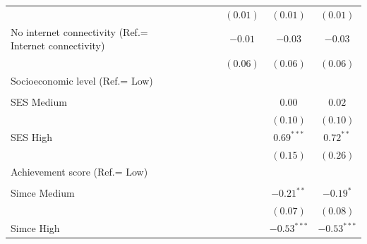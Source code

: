 \documentclass[
  12pt,
  letterpaper,
]{article}
\begin{document}
\begin{table}
{\begin{center}
{\begin{threeparttable}
\begin{tabular}{l c c c c c c}
                                                       &               &               &               & $(0.01)$      & $(0.01)$      & $(0.01)$      \\
No internet connectivity (Ref.= Internet connectivity) &               &               &               & $-0.01$       & $-0.03$       & $-0.03$       \\
                                                       &               &               &               & $(0.06)$      & $(0.06)$      & $(0.06)$      \\
Socioeconomic level (Ref.= Low)                        &               &               &               &               &               &               \\
                                                       &               &               &               &               &               &               \\
\quad SES Medium                                       &               &               &               &               & $0.00$        & $0.02$        \\
                                                       &               &               &               &               & $(0.10)$      & $(0.10)$      \\
\quad SES High                                         &               &               &               &               & $0.69^{***}$  & $0.72^{**}$   \\
                                                       &               &               &               &               & $(0.15)$      & $(0.26)$      \\
Achievement score (Ref.= Low)                          &               &               &               &               &               &               \\
                                                       &               &               &               &               &               &               \\
\quad Simce Medium                                     &               &               &               &               & $-0.21^{**}$  & $-0.19^{*}$   \\
                                                       &               &               &               &               & $(0.07)$      & $(0.08)$      \\
\quad Simce High                                       &               &               &               &               & $-0.53^{***}$ & $-0.53^{***}$ \\

\end{tabular}
\end{threeparttable}}
\end{center}}
\end{table}
\end{document}
